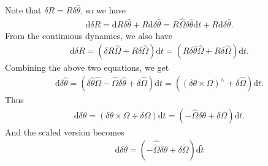 \documentclass[10pt]{article}
\newcommand{\diff}[1]{\mathrm{d}#1}
\begin{document}
Note that $\delta R = R\delta\hat{\theta}$, so we have
\begin{align*}
	\diff{\delta R} = \diff{R} \delta\hat{\theta} + R \diff{\delta\hat{\theta}} = R\hat{\Omega} \delta\hat{\theta} \diff{t} + R \diff{\delta\hat{\theta}}.
\end{align*}
From the continuous dynamics, we also have
\begin{align*}
	\diff{\delta R} = \left( \delta R\hat{\Omega} + R\delta\hat{\Omega} \right) \diff{t} = \left( R\delta\hat{\theta} \hat{\Omega} + R\delta\hat{\Omega} \right) \diff{t}.
\end{align*}
Combining the above two equations, we get
\begin{align*}
	\diff{\delta \hat{\theta}} = \left( \delta\hat{\theta}\hat{\Omega} - \hat{\Omega}\delta\hat{\theta} + \delta\hat{\Omega} \right) \diff{t} = \left( \left( \delta\theta \times \Omega \right)^\wedge + \delta\hat{\Omega} \right) \diff{t}.
\end{align*}
Thus
\begin{align*}
	\diff{\delta\theta} = \left( \delta\theta \times \Omega + \delta\Omega \right) \diff{t} = \left( -\hat{\Omega}\delta\theta + \delta\Omega \right) \diff{t}.
\end{align*}
And the scaled version becomes 
\begin{align}
	\diff{\delta\theta} = \left( -\hat{\tilde{\Omega}}\delta\theta + \delta\tilde{\Omega} \right) \diff{\tilde{t}}
\end{align}
\end{document}
